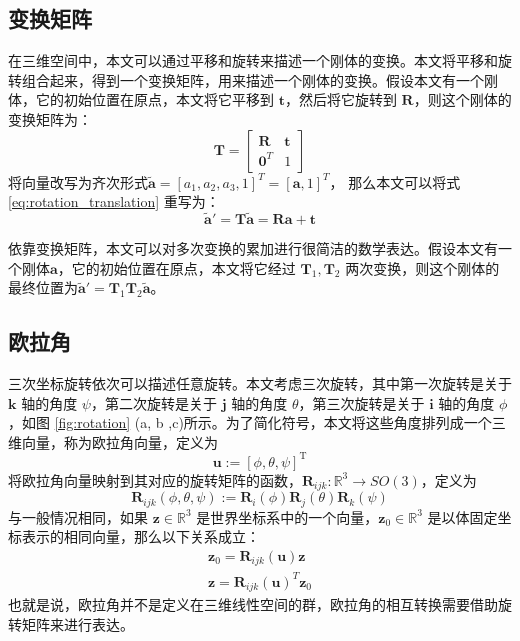 \subsection{变换矩阵}
在三维空间中，本文可以通过平移和旋转来描述一个刚体的变换。本文将平移和旋转组合起来，得到一个变换矩阵，用来描述一个刚体的变换。假设本文有一个刚体，它的初始位置在原点，本文将它平移到 $\boldsymbol{t}$，然后将它旋转到 $\boldsymbol{R}$，则这个刚体的变换矩阵为：
\begin{equation}
    \boldsymbol{T} = 
    \begin{bmatrix}
    \boldsymbol{R} & \boldsymbol{t} \\
    \boldsymbol{0}^T & 1
    \end{bmatrix}
\end{equation}
将向量改写为齐次形式$\widetilde{\boldsymbol{a}} = [a_1, a_2, a_3, 1]^T = [\boldsymbol{a}, 1]^T$， 那么本文可以将式 \ref{eq:rotation_translation} 重写为：
\begin{equation}
    \widetilde{\boldsymbol{a}}' = \boldsymbol{T} \widetilde{\boldsymbol{a}} = \boldsymbol{R} \boldsymbol{a} + \boldsymbol{t}
\end{equation}  

依靠变换矩阵，本文可以对多次变换的累加进行很简洁的数学表达。假设本文有一个刚体$\boldsymbol{a}$，它的初始位置在原点，本文将它经过 $\boldsymbol{T}_1, \boldsymbol{T}_2$ 两次变换，则这个刚体的最终位置为$\widetilde{\boldsymbol{a}}' = \boldsymbol{T}_1 \boldsymbol{T}_2 \widetilde{\boldsymbol{a}}$。

\subsection{欧拉角}
三次坐标旋转依次可以描述任意旋转。本文考虑三次旋转，其中第一次旋转是关于 $\boldsymbol{k}$ 轴的角度 $\psi$，第二次旋转是关于 $\boldsymbol{j}$ 轴的角度 $\theta$，第三次旋转是关于 $\boldsymbol{i}$ 轴的角度 $\phi$，如图 \ref{fig:rotation} (a, b ,c)所示。为了简化符号，本文将这些角度排列成一个三维向量，称为欧拉角向量，定义为 
\begin{equation}
    \boldsymbol{u} := [\phi, \theta, \psi]^\text{T}
\end{equation}
将欧拉角向量映射到其对应的旋转矩阵的函数，$\boldsymbol{R}_{ijk} : \mathbb{R}^3 \to SO(3)$，定义为
\begin{equation}
    \boldsymbol{R}_{ijk}(\phi, \theta, \psi) := \boldsymbol{R}_i(\phi)\boldsymbol{R}_j(\theta)\boldsymbol{R}_k(\psi)
\end{equation}
与一般情况相同，如果 $\boldsymbol{z} \in \mathbb{R}^3$ 是世界坐标系中的一个向量，$\boldsymbol{z}_0 \in \mathbb{R}^3$ 是以体固定坐标表示的相同向量，那么以下关系成立：
\begin{align}
    \boldsymbol{z}_0 = \boldsymbol{R}_{ijk}(\boldsymbol{u}) \boldsymbol{z} \\
    \boldsymbol{z} = \boldsymbol{R}_{ijk}(\boldsymbol{u})^T \boldsymbol{z}_0
\end{align}
也就是说，欧拉角并不是定义在三维线性空间的群，欧拉角的相互转换需要借助旋转矩阵来进行表达。

